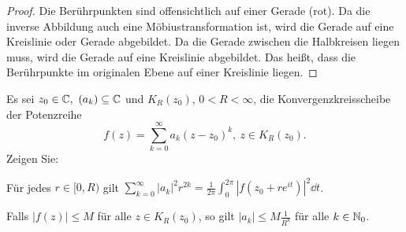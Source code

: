 \begin{proof}
Die Berührpunkten sind offensichtlich auf einer Gerade (rot). Da die inverse Abbildung auch eine Möbiustransformation ist, wird die Gerade auf eine Kreislinie oder Gerade abgebildet. Da die Gerade zwischen die Halbkreisen liegen muss, wird die Gerade auf eine Kreislinie abgebildet. Das heißt, dass die Berührpunkte im originalen Ebene auf einer Kreislinie liegen.
\end{proof}
\begin{Problem}
	Es sei $z_0\in \mathbb{C},~(a_k)\subseteq \mathbb{C}$ und $K_R(z_0)$, $0<R<\infty$, die Konvergenzkreisscheibe der Potenzreihe
	\[
		f(z)=\sum_{k=0}^\infty a_k(z-z_0)^k,~z\in K_R(z_0)
	.\] 
	Zeigen Sie:
	\begin{parts}
		\item F\"{u}r jedes $r\in [0,R)$ gilt $\sum_{k=0}^\infty |a_k|^2 r^{2k}=\frac{1}{2\pi}\int_0^{2\pi} |f(z_0+re^{it})|^2\dd{t}$.
		\item Falls $|f(z)|\le M$ f\"{u}r alle $z\in K_R(z_0)$, so gilt $|a_k|\le M \frac{1}{R^k}$ f\"{u}r alle $k\in \mathbb{N}_0$.
	\end{parts}
\end{Problem}

